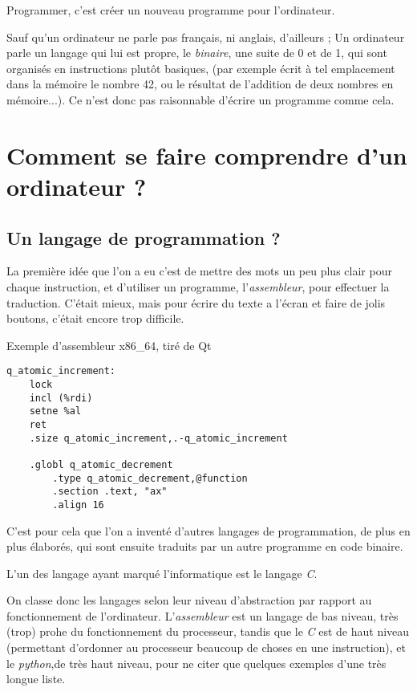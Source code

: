 Programmer, c'est créer un nouveau programme pour l'ordinateur.

Sauf qu'un ordinateur ne parle pas français, ni anglais, d'ailleurs ; Un ordinateur parle un
langage qui lui est propre, le \emph{binaire}, une suite de 0 et de 1, qui sont organisés en
instructions plutôt basiques, (par exemple écrit à tel emplacement dans la mémoire le
nombre 42, ou le résultat de l'addition de deux nombres en mémoire...). Ce n'est donc pas
raisonnable d'écrire un programme comme cela.
\section{Comment se faire comprendre d'un ordinateur ?}
\subsection{Un langage de programmation ?}
La première idée que l'on a eu c'est de mettre des mots un peu plus clair pour chaque
instruction, et d'utiliser un programme, l'\emph{assembleur}, pour effectuer la traduction. C'était
mieux, mais pour écrire du texte a l'écran et faire de jolis boutons, c'était encore trop
difficile.
\begin{listing}[h]
\caption{Exemple d'assembleur x86\_64, tiré de Qt}
\begin{verbatim}
q_atomic_increment:
    lock
    incl (%rdi)
    setne %al
    ret
    .size q_atomic_increment,.-q_atomic_increment

    .globl q_atomic_decrement
        .type q_atomic_decrement,@function
        .section .text, "ax"
        .align 16
\end{verbatim}
\end{listing}

C'est pour cela que l'on a inventé d'autres langages de programmation, de plus en plus
élaborés, qui sont ensuite traduits par un autre programme en code binaire.

L'un des langage ayant marqué l'informatique est le langage \emph{C}.

On classe donc les langages selon leur niveau d'abstraction par rapport au
fonctionnement de l'ordinateur. L'\emph{assembleur} est un langage de bas niveau, très (trop)
prohe du fonctionnement du processeur, tandis que le \emph{C} est de haut niveau (permettant
d'ordonner au processeur beaucoup de choses en une instruction), et le \emph{python},de très
haut niveau, pour ne citer que quelques exemples d'une très longue liste.%


